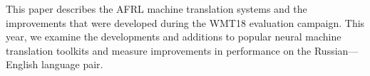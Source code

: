 This paper describes the AFRL machine translation systems and the improvements that were developed during the WMT18 evaluation campaign. This year, we examine the developments and additions to popular neural machine translation toolkits and measure improvements in performance on the Russian---English language pair.
